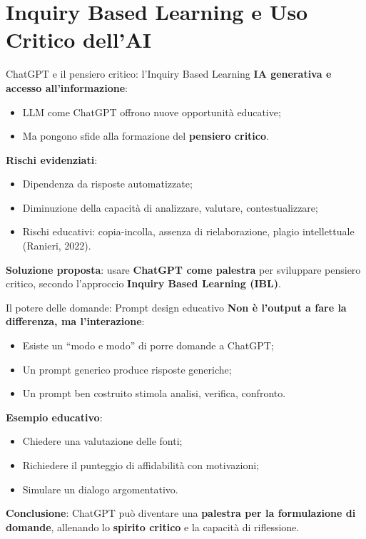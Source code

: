 \documentclass{beamer}
\begin{document}
\section{Inquiry Based Learning e Uso Critico dell'AI}
%
%
\begin{frame}{ChatGPT e il pensiero critico: l’Inquiry Based Learning}
\small
\textbf{IA generativa e accesso all’informazione}:
\begin{itemize}
    \item LLM come ChatGPT offrono nuove opportunità educative;
    \item Ma pongono sfide alla formazione del \textbf{pensiero critico}.
\end{itemize}

\vspace{0.2cm}
\textbf{Rischi evidenziati}:
\begin{itemize}
    \item Dipendenza da risposte automatizzate;
    \item Diminuzione della capacità di analizzare, valutare, contestualizzare;
    \item Rischi educativi: copia-incolla, assenza di rielaborazione, plagio intellettuale (Ranieri, 2022).
\end{itemize}

\vspace{0.2cm}
\textbf{Soluzione proposta}: usare \textbf{ChatGPT come palestra} per sviluppare pensiero critico, secondo l’approccio \textbf{Inquiry Based Learning (IBL)}.
\end{frame}
%
%
\begin{frame}{Il potere delle domande: Prompt design educativo}
\small
\textbf{Non è l’output a fare la differenza, ma l’interazione}:
\begin{itemize}
    \item Esiste un “modo e modo” di porre domande a ChatGPT;
    \item Un prompt generico produce risposte generiche;
    \item Un prompt ben costruito stimola analisi, verifica, confronto.
\end{itemize}

\vspace{0.3cm}
\textbf{Esempio educativo}:
\begin{itemize}
    \item Chiedere una valutazione delle fonti;
    \item Richiedere il punteggio di affidabilità con motivazioni;
    \item Simulare un dialogo argomentativo.
\end{itemize}

\vspace{0.3cm}
\textbf{Conclusione}: ChatGPT può diventare una \textbf{palestra per la formulazione di domande}, allenando lo \textbf{spirito critico} e la capacità di riflessione.
\end{frame}
\end{document}
